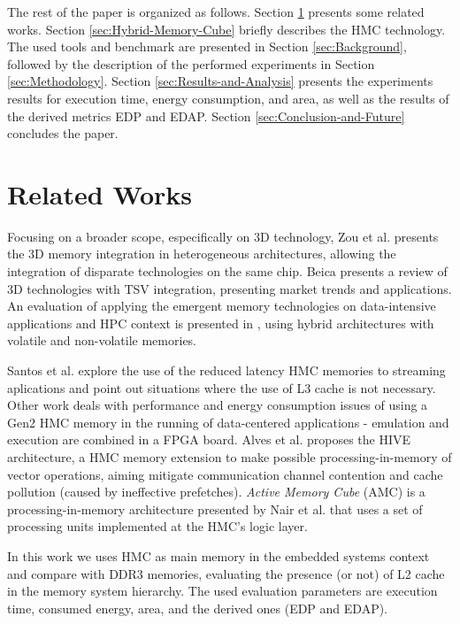 \documentclass{sig-alternate-05-2015}
\begin{document}
The rest of the paper is organized as follows. Section \ref{sec:Related-Works} presents some related works. Section \ref{sec:Hybrid-Memory-Cube} briefly describes the HMC technology. The used tools and benchmark are presented in Section \ref{sec:Background}, followed by the description of the performed experiments in Section \ref{sec:Methodology}. Section \ref{sec:Results-and-Analysis} presents the experiments results for execution time, energy consumption, and area, as well as the results of the derived metrics EDP and EDAP. Section \ref{sec:Conclusion-and-Future} concludes the paper.

\section{Related Works} \label{sec:Related-Works}
Focusing on a broader scope, especifically on 3D technology, Zou et al. \cite{zou2015Heterogeneous3D} presents the 3D memory integration in heterogeneous architectures, allowing the integration of disparate technologies on the same chip. Beica \cite{beica2015_3D_Integration} presents a review of 3D technologies with TSV integration, presenting market trends and applications. An evaluation of applying the emergent
memory technologies on data-intensive applications and HPC context is presented in \cite{suresh2014evaluation}, using hybrid architectures with volatile and non-volatile memories.

Santos et al. \cite{santos2016exploring} explore the use of the reduced latency HMC memories to streaming aplications and point out situations where the use of L3 cache is not necessary. Other work \cite{gokhale2015HMC_Charac_wrklds} deals with performance and energy consumption issues of using a Gen2 HMC memory in the running of data-centered applications - emulation and execution are combined in a FPGA board. Alves et al. \cite{alves2016large} proposes the HIVE architecture, a HMC memory extension to make possible processing-in-memory of vector operations, aiming mitigate communication channel contention and cache pollution (caused by ineffective prefetches). \emph{Active Memory Cube }(AMC) is a processing-in-memory architecture presented by Nair et al. \cite{nair2015active} that uses a set of processing units implemented at the HMC's logic layer. 

In this work we uses HMC as main memory in the embedded systems context and compare with DDR3 memories, evaluating the presence (or not) of L2 cache in the memory system hierarchy. The used evaluation parameters are execution time, consumed energy, area, and the derived ones (EDP and EDAP).
\end{document}
